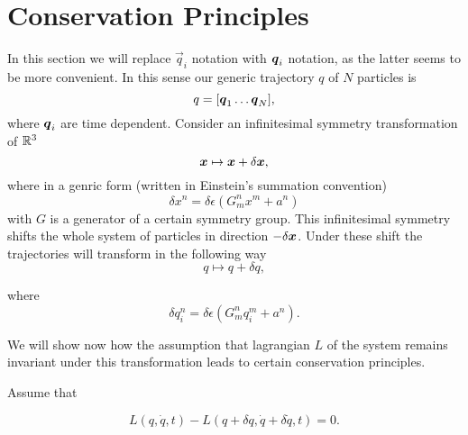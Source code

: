 \documentclass[main.tex]{subfiles}
\begin{document}
\section{Conservation Principles}
In this section we will replace $\vec{q}_i$ notation with $\boldsymbol{q}_i$ notation, as the latter seems to be more convenient. In this sense our generic trajectory $q$ of $N$ particles is 
\begin{equation}
q = [\boldsymbol{q}_1 \dots \boldsymbol{q}_N],
\end{equation}
where $\boldsymbol{q}_i$ are time dependent.
Consider an infinitesimal symmetry transformation of $\mathbb{R}^3$
\begin{equation}
\boldsymbol{x} \mapsto \boldsymbol{x} + \delta\boldsymbol{x},
\end{equation}
where in a genric form (written in Einstein's summation convention)
\begin{equation}
\delta x^n = \delta\epsilon(G^n_m x^m + a^n)
\end{equation}
with $G$ is a generator of a certain symmetry group.
This infinitesimal symmetry shifts the whole system of particles in direction $-\delta \boldsymbol{x}$.
Under these shift the trajectories will transform in the following way
\begin{equation}
q \mapsto q + \delta q,
\end{equation} 

where 
\begin{equation}
\delta q^n_i = \delta\epsilon(G^n_m q^m_i + a^n).
\end{equation}

We will show now how the assumption that lagrangian $L$ of the system remains invariant under this transformation leads to certain conservation principles.

Assume that 

\begin{equation}
L(q, \dot{q}, t) - L(q + \delta q, \dot{q} + \delta \dot{q}, t) = 0.
\end{equation}
\end{document}

